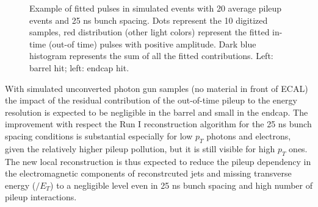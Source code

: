\documentclass[journal]{IEEEtran}
\begin{document}
\begin{figure}[!t]
  \begin{center}
    \caption{Example of fitted pulses in simulated events with 20 average pileup events and 25 ns bunch spacing. Dots represent the 10 digitized samples, red distribution (other light colors) represent the fitted in-time (out-of time) pulses with positive amplitude. Dark blue histogram represents the sum of all the fitted contributions. Left: barrel hit; left: endcap hit.  \label{fig:multifits} }
  \end{center}
\end{figure}
%
With simulated unconverted photon gun samples (no material in front of ECAL) the impact of the residual contribution of the out-of-time pileup to the energy resolution is expected to be negligible in the barrel and small in the endcap. The improvement with respect the Run I reconstruction algorithm for the 25 ns bunch spacing conditions is substantial especially for low $p_T$ photons and electrons, given the relatively higher pileup pollution, but it is still visible for high $p_T$ ones. The new local reconstruction is thus expected to reduce the pileup dependency in the electromagnetic components of reconstrcuted jets and missing transverse energy ($\slash E_T$) to a negligible level even in 25 ns bunch spacing and high number of pileup interactions.
\end{document}
